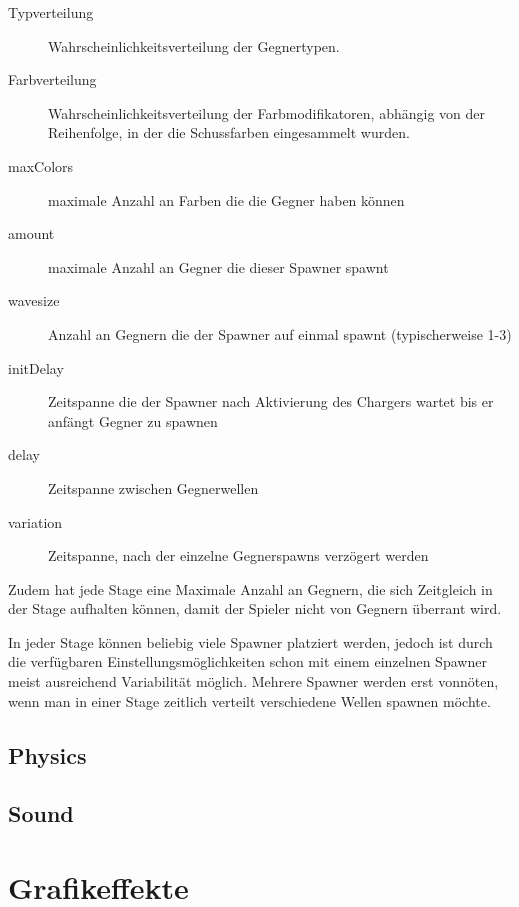 \documentclass[a4paper,10pt,ngerman,fontsize=12pt]{scrreprt}
\begin{document}
\begin{description}
\item[Typverteilung] Wahrscheinlichkeitsverteilung der Gegnertypen.
\item[Farbverteilung] Wahrscheinlichkeitsverteilung der Farbmodifikatoren, abhängig von der Reihenfolge, in der die Schussfarben eingesammelt wurden.
\item[maxColors] maximale Anzahl an Farben die die Gegner haben können
\item[amount] maximale Anzahl an Gegner die dieser Spawner spawnt
\item[wavesize] Anzahl an Gegnern die der Spawner auf einmal spawnt (typischerweise 1-3)
\item[initDelay] Zeitspanne die der Spawner nach Aktivierung des Chargers wartet bis er anfängt Gegner zu spawnen
\item[delay] Zeitspanne zwischen Gegnerwellen
\item[variation] Zeitspanne, nach der einzelne Gegnerspawns verzögert werden
\end{description}

Zudem hat jede Stage eine Maximale Anzahl an Gegnern, die sich Zeitgleich in der Stage aufhalten können, damit der Spieler nicht von Gegnern überrant wird.

In jeder Stage können beliebig viele Spawner platziert werden, jedoch ist durch die verfügbaren Einstellungsmöglichkeiten schon mit einem einzelnen Spawner meist ausreichend Variabilität möglich. Mehrere Spawner werden erst vonnöten, wenn man in einer Stage zeitlich verteilt verschiedene Wellen spawnen möchte.




\section{Physics}

\lipsum[3]



\section{Sound}

\lipsum[3]




\chapter{Grafikeffekte}
\end{document}
